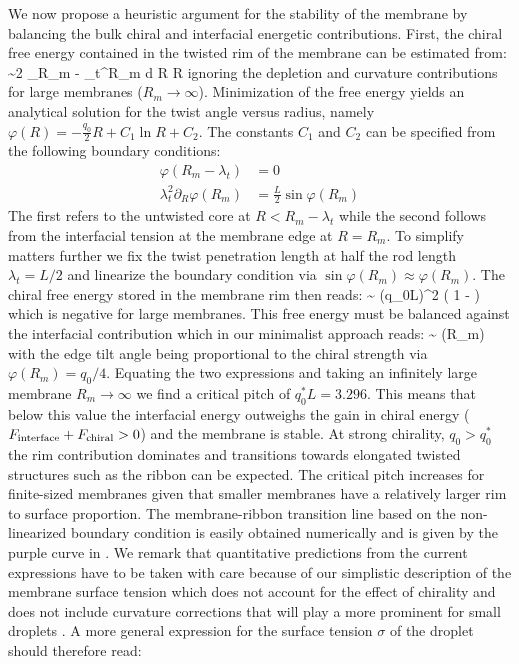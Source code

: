 We now propose a  heuristic argument for the stability of the membrane  by balancing the bulk chiral and interfacial energetic contributions. First, the chiral free energy contained in the twisted rim of the membrane can be estimated from: 
\beq
{} \sim 2 \pi \int_{R_{m} - \lambda_{t}}^{R_{m}} d R R  
\eeq
ignoring the depletion and curvature contributions for large membranes ($R_{m} \rightarrow \infty $).  Minimization of the free energy yields an analytical solution for the twist angle versus radius, namely $\varphi(R) = -\frac{q_{0}}{2}R + C_{1} \ln R + C_{2}$. The constants $C_{1}$ and $C_{2}$ can be specified from the following boundary conditions:
\begin{align}
\varphi(R_{m} - \lambda_{t}) &= 0 \nonumber \\ 
\lambda_{t} ^{2}\partial_{R} \varphi(R_{m}) &= \frac{L}{2} \sin \varphi(R_{m}) 
\label{bc}
\end{align}
The first refers to the untwisted core at $R < R_{m} - \lambda_{t}$ while the second follows from the interfacial tension at the membrane edge at $R = R_{m}$.  To simplify matters further we fix the twist penetration length at half the rod length $\lambda_{t} =L/2$ \cite{barry_jpcb2009} and linearize the boundary condition via $ \sin \varphi(R_{m})  \approx \varphi(R_{m}) $. The chiral free energy stored in the membrane rim then reads: 
\beq
{} \sim {} (q_{0}L)^{2} \left ( 1 -  \right ) 
\eeq
which is negative for large membranes. This free energy must be balanced against the interfacial contribution which in our minimalist approach reads:
\beq
{} \sim {} \cos \varphi(R_{m})
\eeq
with the edge tilt angle being proportional to the chiral strength via $\varphi(R_{m}) = q_{0}/4$. Equating the two expressions and taking an infinitely large membrane $R_{m} \rightarrow \infty$ we find a critical pitch of $q_{0}^{\ast} L = 3.296$.  This means that below this value the interfacial energy outweighs the gain in chiral energy ($F_{\rm interface} + F_{\rm chiral} >0$) and the membrane is stable. At strong chirality, $q_{0} > q_{0}^{\ast}$ the rim contribution dominates and transitions towards elongated twisted structures such as the ribbon can be expected.  The critical pitch increases for finite-sized membranes given that smaller membranes have a relatively larger rim to surface proportion. The membrane-ribbon transition line based on the non-linearized boundary condition  is easily obtained numerically and is given by the purple curve in .  We remark that quantitative predictions from the current expressions have to be taken with care because of our simplistic description of the membrane surface tension which does not account for the effect of chirality and does not include curvature corrections that will play a more prominent for small droplets \cite{malijevsky2012perspective}.  A more general expression for the surface tension $\sigma$ of the droplet should therefore read:
